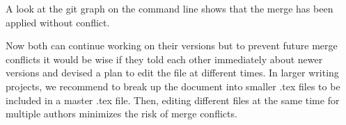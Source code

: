 A look at the git graph on the command line shows that the merge has been applied without conflict.

Now both can continue working on their versions but to prevent future merge conflicts it would be wise if they told each other immediately about newer versions and devised a plan to edit the file at different times.  In larger writing projects, we recommend to break up the document into smaller .tex files to be included in a master .tex file.  Then, editing different files at the same time for multiple authors minimizes the risk of merge conflicts.
